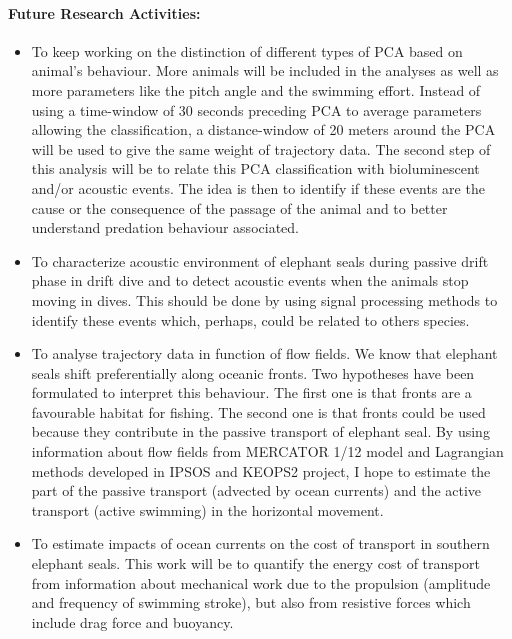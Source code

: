 \documentclass[12pt,a4paper]{report}
\begin{document}
\paragraph{Future Research Activities:}
	\begin{itemize}
	\item
To keep working on the distinction of different types of PCA based on animal’s behaviour. More animals will be included in the analyses as well as more parameters like the pitch angle and the swimming effort. Instead of using a time-window of 30 seconds preceding PCA to average parameters allowing the classification, a distance-window of 20 meters around the PCA will be used to give the same weight of trajectory data. The second step of this analysis will be to relate this PCA classification with bioluminescent and/or acoustic events. The idea is then to identify if these events are the cause or the consequence of the passage of the animal and to better understand predation behaviour associated.
	\item
To characterize acoustic environment of elephant seals during passive drift phase in drift dive and to detect acoustic events when the animals stop moving in dives. This should be done by using signal processing methods to identify these events which, perhaps, could be related to others species. 
	\item
To analyse trajectory data in function of flow fields. We know that elephant seals shift preferentially along oceanic fronts. Two hypotheses have been formulated to interpret this behaviour. The first one is that fronts are a favourable habitat for fishing. The second one is that fronts could be used because they contribute in the passive transport of elephant seal. By using information about flow fields from MERCATOR 1/12 model and Lagrangian methods developed in IPSOS and KEOPS2 project, I hope to estimate the part of the passive transport (advected by ocean currents) and the active transport (active swimming) in the horizontal movement.
	\item
To estimate impacts of ocean currents on the cost of transport in southern elephant seals. This work will be to quantify the energy cost of transport from information about mechanical work due to the propulsion (amplitude and frequency of swimming stroke), but also from resistive forces which include drag force and buoyancy.
	\end{itemize}
\end{document}
